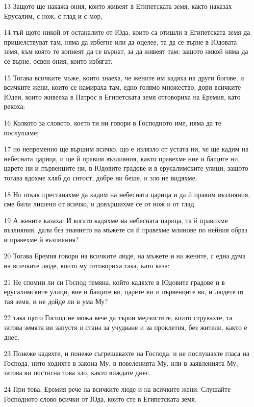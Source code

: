 \par 13 Защото ще накажа ония, които живеят в Египетската земя, както наказах Ерусалим, с нож, с глад и с мор,
\par 14 тъй щото никой от останалите от Юда, които са отишли в Египетската земя да пришелствуват там, няма да избегне или да оцелее, та да се върне в Юдовата земя, към която те копнеят да се върнат, за да живеят там; защото никой няма да се върне, освен ония, които избягат.
\par 15 Тогава всичките мъже, които знаеха, че жените им кадяха на други богове, и всичките жени, които се намираха там, едно голямо множество, дори всичките Юдеи, които живееха в Патрос в Египетската земя отговориха на Еремия, като рекоха:
\par 16 Колкото за словото, което ти ни говори в Господното име, няма да те послушаме;
\par 17 но непременно ще вършим всичко, що е излязло от устата ни, че ще кадим на небесната царица, и ще й правим възлияния, както правехме ние и бащите ни, царете ни и първенците ни, в Юдовите градове и в ерусалимските улици; защото тогава ядохме хляб до ситост, добре ни беше, и зло не видяхме.
\par 18 Но откак престанахме да кадим на небесната царица и да й правим възлияния, сме били лишени от всичко, и довършихме се от нож и от глад.
\par 19 А жените казаха: И когато кадяхме на небесната царица, та й правихме възлияния, дали без знанието на мъжете си й правехме млинове по нейния образ и правехме й възлияния?
\par 20 Тогава Еремия говори на всичките люде, на мъжете и на жените, с една дума на всичките люде, които му отговориха така, като каза:
\par 21 Не спомни ли си Господ темяна, който кадяхте в Юдовите градове и в ерусалимските улици, вие и бащите ви, царете ви и първенците ви, и людете от тая земя, и не дойде ли в ума Му?
\par 22 така щото Господ не можа вече да търпи мерзостите, които струвахте, та затова земята ви запустя и стана за учудване и за проклетия, без жители, както е днес.
\par 23 Понеже кадяхте, и понеже съгрешавахте на Господа, и не послушахте гласа на Господа, нито ходихте в закона Му, в повеленията Му, или в заявленията Му, затова ви постигна това зло, както виждате днес.
\par 24 При това, Еремия рече на всичките люде и на всичките жени: Слушайте Господното слово всички от Юда, които сте в Египетската земя.
